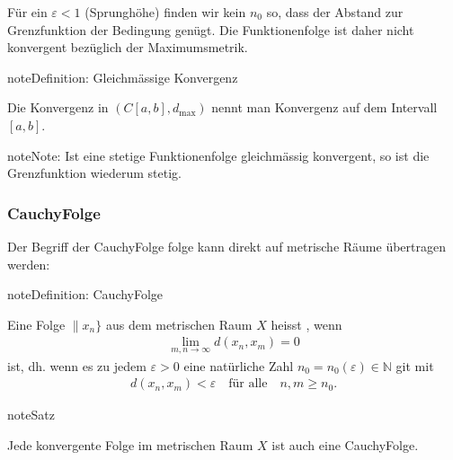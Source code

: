 \documentclass[letterpaper,10pt,english]{jupyterBook}
\begin{document}
\noindent{}

Für ein \(\varepsilon < 1\) (Sprunghöhe) finden wir kein \(n_0\) so, dass der Abstand zur Grenzfunktion der Bedingung genügt. Die Funktionenfolge ist daher nicht konvergent bezüglich der Maximumsmetrik.

\begin{sphinxadmonition}{note}{Definition: Gleichmässige Konvergenz}

Die Konvergenz in \((C[a,b],d_{\max})\) nennt man  Konvergenz auf dem Intervall \([a,b]\).
\end{sphinxadmonition}

\begin{sphinxadmonition}{note}{Note:}
Ist eine stetige Funktionenfolge gleichmässig konvergent, so ist die Grenzfunktion wiederum stetig.
\end{sphinxadmonition}


\subsubsection{Cauchy\sphinxhyphen{}Folge}
\label{\detokenize{Funktionalanalysis/Funktionalanalysis:cauchy-folge}}
Der Begriff der Cauchy\sphinxhyphen{}Folge folge kann direkt auf metrische Räume übertragen werden:

\begin{sphinxadmonition}{note}{Definition: Cauchy\sphinxhyphen{}Folge}

Eine Folge \(\|x_n\}\) aus dem metrischen Raum \(X\) heisst , wenn
\begin{equation*}
\begin{split}\lim_{m,n\to\infty} d(x_n,x_m) = 0\end{split}
\end{equation*}
ist, dh. wenn es zu jedem \(\varepsilon > 0\) eine natürliche Zahl \(n_0 = n_0(\varepsilon)\in\mathbb{N}\) git mit
\begin{equation*}
\begin{split}d(x_n,x_m) < \varepsilon\quad\text{für alle}\quad n,m \ge n_0.\end{split}
\end{equation*}\end{sphinxadmonition}

\begin{sphinxadmonition}{note}{Satz}

Jede konvergente Folge im metrischen Raum \(X\) ist auch eine Cauchy\sphinxhyphen{}Folge.
\end{sphinxadmonition}
\end{document}
